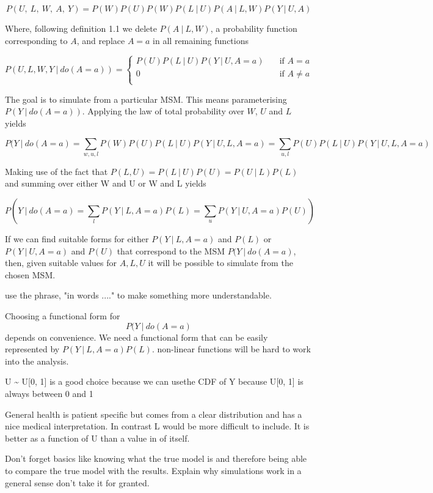 \documentclass[11pt]{article}
\begin{document}
\[P(U,\ L,\ W,\ A,\ Y) = P(W)P(U)P(W)P(L\ |\ U)P(A\ |\ L,W)P(Y\ |\ U,A)\]

Where, following definition 1.1 we delete \(P(A\ |\ L,W)\), a
probability function corresponding to \(A\), and replace \(A=a\) in all
remaining functions

\[ P(U, L, W, Y\ |\ do(A=a)) =
  \begin{cases}
    P(U)P(L\ |\ U)P(Y\ |\ U,A = a) & \quad \text{if } A = a\\
    0  & \quad \text{if } A \neq a\\
  \end{cases}
\]

The goal is to simulate from a particular MSM. This means parameterising
\(P(Y\ |\ do(A=a))\). Applying the law of total probability over \(W\),
\(U\) and \(L\) yields

\[P(Y\ |\ do(A=a) = \sum_{w, u, l} P(W)P(U)P(L\ |\ U)P(Y\ |\ U, L, A=a) = \sum_{u, l} P(U)P(L\ |\ U)P(Y\ |\ U, L, A=a)\]

Making use of the fact that
\(P(L, U) = P(L\ |\  U)P(U) = P(U\ |\ L)P(L)\) and summing over either W
and U or W and L yields

\[P(Y\ |\ do(A=a) = \sum_{l}P(Y\ |\ L, A=a)P(L) = \sum_{u} P(Y\ |\ U, A=a)P(U))\]

If we can find suitable forms for either \(P(Y\ |\ L, A=a)\) and
\(P(L)\) or \(P(Y\ |\ U, A=a)\) and \(P(U)\) that correspond to the MSM
\(P(Y\ |\ do(A=a)\), then, given suitable values for \(A, L, U\) it will
be possible to simulate from the chosen MSM.

use the phrase, "in words ...." to make something more understandable.

Choosing a functional form for \[P(Y\ |\ do(A=a)\] depends on
convenience. We need a functional form that can be easily represented by
\(P(Y\ |\ L, A=a)P(L)\). non-linear functions will be hard to work into
the analysis.

U \textasciitilde{} U{[}0, 1{]} is a good choice because we can usethe
CDF of Y because U{[}0, 1{]} is always between 0 and 1

General health is patient specific but comes from a clear distribution
and has a nice medical interpretation. In contrast L would be more
difficult to include. It is better as a function of U than a value in of
itself.

Don't forget basics like knowing what the true model is and therefore
being able to compare the true model with the results. Explain why
simulations work in a general sense don't take it for granted.
\end{document}
